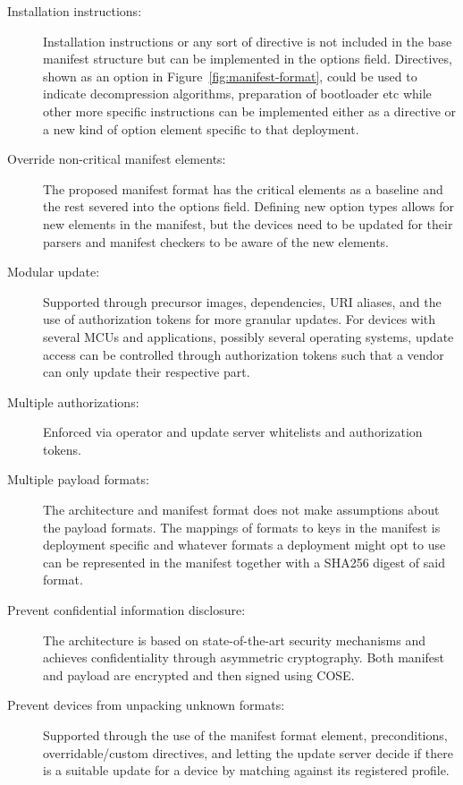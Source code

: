 \documentclass[0-thesis.tex]{subfiles}
\begin{document}
\begin{description}
    \item[Installation instructions:]
        Installation instructions or any sort of directive is not included in the base
        manifest structure but can be implemented in the options field. Directives, shown
        as an option in Figure~\ref{fig:manifest-format}, could be used to indicate
        decompression algorithms, preparation of bootloader etc while other more specific
        instructions can be implemented either as a directive or a new kind of option
        element specific to that deployment.

    \item[Override non-critical manifest elements:]
        The proposed manifest format has the critical elements as a baseline and the rest
        severed into the options field. Defining new option types allows for new
        elements in the manifest, but the devices need to be updated for their parsers and
        manifest checkers to be aware of the new elements.

    \item[Modular update:]
        Supported through precursor images, dependencies, URI aliases, and the use of
        authorization tokens for more granular updates. For devices with several MCUs and
        applications, possibly several operating systems, update access can be controlled
        through authorization tokens such that a vendor can only update their respective
        part.

    \item[Multiple authorizations:]
        Enforced via operator and update server whitelists and authorization tokens.

    \item[Multiple payload formats:]
        The architecture and manifest format does not make assumptions about the payload
        formats. The mappings of formats to keys in the manifest is deployment
        specific and whatever formats a deployment might opt to use can be represented in
        the manifest together with a SHA256 digest of said format.

    \item[Prevent confidential information disclosure:]
        The architecture is based on state-of-the-art security mechanisms and achieves
        confidentiality through asymmetric cryptography. Both manifest and payload are
        encrypted and then signed using COSE.

    \item[Prevent devices from unpacking unknown formats:]
        Supported through the use of the manifest format element, preconditions,
        overridable/custom directives, and letting the update server decide if there is a
        suitable update for a device by matching against its registered profile.


\end{description}
\end{document}
